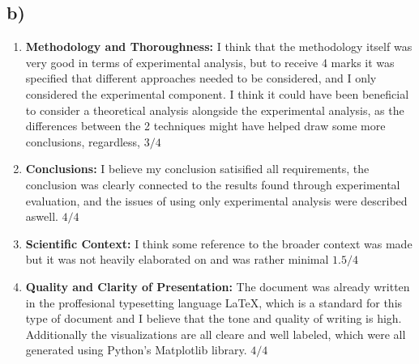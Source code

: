 \documentclass{article}
\begin{document}
\subsection*{b)}
\begin{enumerate}
  \item \textbf{Methodology and Thoroughness: } I think that the methodology itself was very good in terms of experimental analysis, but to receive 4 marks it was specified that different approaches needed to be considered, and I only considered the experimental component. I think it could have been beneficial to consider a theoretical analysis alongside the experimental analysis, as the differences between the 2 techniques might have helped draw some more conclusions, regardless, $\boxed{3/4}$
  \item \textbf{Conclusions:} I believe my conclusion satisified all requirements, the conclusion was clearly connected to the results found through experimental evaluation, and the issues of using only experimental analysis were described aswell. $\boxed{4/4}$
  \item \textbf{Scientific Context:} I think some reference to the broader context was made but it was not heavily elaborated on and was rather minimal $\boxed{1.5/4}$
  \item \textbf{Quality and Clarity of Presentation:} The document was already written in the proffesional typesetting language \LaTeX, which is a standard for this type of document and I believe that the tone and quality of writing is high. Additionally the visualizations are all cleare and well labeled, which were all generated using Python's Matplotlib library. $\boxed{4/4}$
\end{enumerate}
\end{document}
